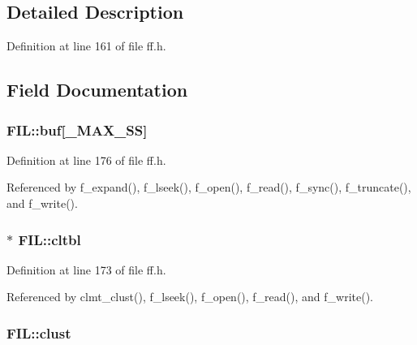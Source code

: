 \subsection{Detailed Description}


Definition at line 161 of file ff.\+h.



\subsection{Field Documentation}
\subsubsection[{\texorpdfstring{buf}{buf}}]{ F\+I\+L\+::buf\mbox{[}{\bf \+\_\+\+M\+A\+X\+\_\+\+SS}\mbox{]}}\hypertarget{structFIL_a7a95fb86588663e48309b5cded7e207b}{}\label{structFIL_a7a95fb86588663e48309b5cded7e207b}


Definition at line 176 of file ff.\+h.



Referenced by f\+\_\+expand(), f\+\_\+lseek(), f\+\_\+open(), f\+\_\+read(), f\+\_\+sync(), f\+\_\+truncate(), and f\+\_\+write().

\subsubsection[{\texorpdfstring{cltbl}{cltbl}}]{$\ast$ F\+I\+L\+::cltbl}\hypertarget{structFIL_a28a30613d48cefcf9efbd334cd861fc8}{}\label{structFIL_a28a30613d48cefcf9efbd334cd861fc8}


Definition at line 173 of file ff.\+h.



Referenced by clmt\+\_\+clust(), f\+\_\+lseek(), f\+\_\+open(), f\+\_\+read(), and f\+\_\+write().

\subsubsection[{\texorpdfstring{clust}{clust}}]{ F\+I\+L\+::clust}\hypertarget{structFIL_aa41312aba551b9a6d1c9d3c8c7d2734b}{}\label{structFIL_aa41312aba551b9a6d1c9d3c8c7d2734b}


